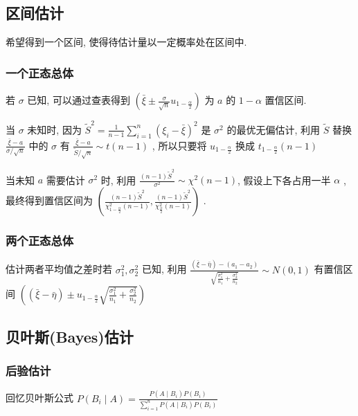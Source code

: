 \documentclass[10pt]{yerbaformat}
\begin{document}
\subsection{区间估计}
\par 希望得到一个区间, 使得待估计量以一定概率处在区间中.
\subsubsection{一个正态总体}
\par 若 $\sigma$ 已知, 可以通过查表得到 $\left(\bar{\xi} \pm \frac{\sigma}{\sqrt{n}} u_{1-\frac{\alpha}{2}}\right)$ 为 $a$ 的 $1-\alpha$ 置信区间.

\par 当 $\sigma$ 未知时, 因为 $\tilde{S}^{2}=\frac{1}{n-1} \sum_{i=1}^{n}\left(\xi_{i}-\bar{\xi}\right)^{2}$ 是 $\sigma^{2}$ 的最优无偏估计, 利用 $\tilde{S}$ 替换 $\frac{\bar{\xi}-a}{\sigma / \sqrt{n}}$ 中的 $\sigma$ 有 $\frac{\bar{\xi}-a}{\tilde{S} / \sqrt{n}} \sim t(n-1)$ , 所以只要将 $u_{1-\frac{\alpha}{2}}$ 换成 $t_{1-\frac{\alpha}{2}}(n-1)$

\par 当未知 $a$ 需要估计 $\sigma^2$ 时, 利用 $\frac{(n-1) \tilde{S}^{2}}{\sigma^{2}} \sim \chi^{2}(n-1)$, 假设上下各占用一半 $\alpha$ , 最终得到置信区间为 $\left(\frac{(n-1) \tilde{S}^{2}}{\chi_{1-\frac{\alpha}{2}}^{2}(n-1)}, \frac{(n-1) \tilde{S}^{2}}{\chi_{\frac{\alpha}{2}}^{2}(n-1)}\right)$ .

\subsubsection{两个正态总体}
\par 估计两者平均值之差时若 $\sigma_{1}^{2}, \sigma_{2}^{2}$ 已知, 利用 $\frac{(\bar{\xi}-\bar{\eta})-\left(a_{1}-a_{2}\right)}{\sqrt{\frac{\sigma_{1}^{2}}{n_{1}}+\frac{\sigma_{2}^{2}}{n_{2}}}} \sim N(0,1)$ 有置信区间 $\left((\bar{\xi}-\bar{\eta}) \pm u_{1-\frac{\alpha}{2}} \sqrt{\frac{\sigma_{1}^{2}}{n_{1}}+\frac{\sigma_{2}^{2}}{n_{2}}}\right)$


\subsection{贝叶斯(Bayes)估计}

\subsubsection{后验估计}

\par 回忆贝叶斯公式 $P\left(B_{i} \mid A\right)=\frac{P\left(A \mid B_{i}\right) P\left(B_{i}\right)}{\sum_{i=1}^{n} P\left(A \mid B_{i}\right) P\left(B_{i}\right)}$
\end{document}
